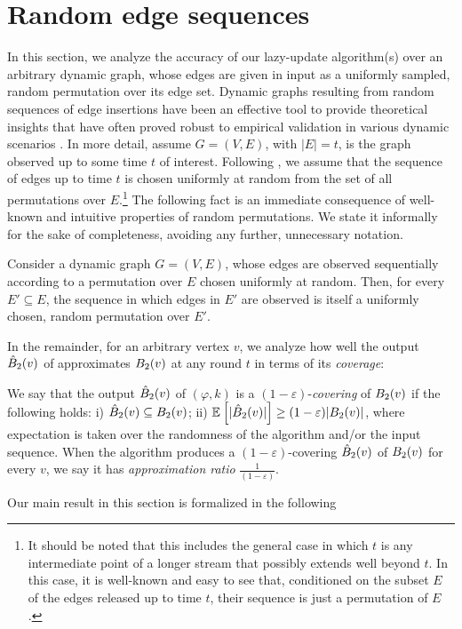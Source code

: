 \section{Random edge sequences}\label{subse:rand_perm}
In this section, we analyze the accuracy of our lazy-update algorithm(s) over an arbitrary dynamic graph, whose edges are given in input as a uniformly sampled, random permutation over its edge set.
Dynamic graphs resulting from random sequences of edge insertions have been an effective tool to provide theoretical insights that have often proved robust to empirical validation in various dynamic scenarios \cite{monemizadeh2017testable,kapralov2014approximating,peng2018estimating,mcgregor2014graph,chakrabarti2008robust}.
In more detail, assume $G = (V, E)$, with $|E| = t$, is the graph observed up to some time $t$ of interest. Following \cite{monemizadeh2017testable,peng2018estimating}, we assume that the sequence of edges up to time $t$ is chosen uniformly at random from the set of all permutations over $E$.\footnote{It should be noted that this includes the general case in which $t$ is any intermediate point of a longer stream that possibly extends well beyond $t$. In this case, it is well-known and easy to see that, conditioned on the subset $E$ of the edges released up to time $t$, their sequence is just a permutation of $E$.} The following fact is an immediate consequence of well-known and intuitive properties of random permutations. We state it informally for the sake of completeness, avoiding any further, unnecessary notation.
\begin{fact}\label{fa:perm}
    Consider a dynamic graph $G = (V, E)$, whose edges are observed sequentially according to a permutation over $E$ chosen uniformly at random. Then, for every $E'\subseteq E$, the sequence in which edges in $E'$ are observed is itself a uniformly chosen, random permutation over $E'$.
\end{fact}



In the remainder, for an arbitrary vertex $v$, we analyze how well the output $\hat{B}_2(v)$ of  approximates $B_2(v)$ at any round $t$ in terms of its \emph{coverage}:

\begin{definition}\label{def:coverage}
    We say that the output  $\hat{B}_2(v)$  of \lazyscheme$(\varphi,k)$ is a $(1-\varepsilon)$-\textit{covering} of $B_2(v)$ if the following holds: i) $\hat{B}_2(v) \subseteq B_2(v)$; ii) $\mathbb{E}_{} \left[ \vert \hat{B}_2(v) \vert \right] \geq (1-\varepsilon) \vert B_2(v) \vert$, where expectation is taken over the randomness of the algorithm and/or the input sequence. When the algorithm produces a $(1-\varepsilon)$-covering $\hat{B}_2(v)$ of $B_2(v)$ for every $v$, we say it has \emph{approximation ratio} $\frac{1}{(1-\varepsilon)}$.
\end{definition}
Our main result in this section is formalized in the following 

